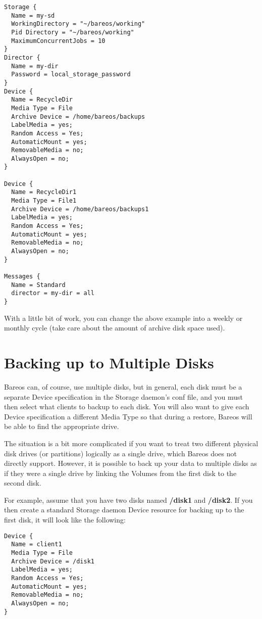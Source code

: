 \footnotesize
\begin{verbatim}
Storage {
  Name = my-sd
  WorkingDirectory = "~/bareos/working"
  Pid Directory = "~/bareos/working"
  MaximumConcurrentJobs = 10
}
Director {
  Name = my-dir
  Password = local_storage_password
}
Device {
  Name = RecycleDir
  Media Type = File
  Archive Device = /home/bareos/backups
  LabelMedia = yes;
  Random Access = Yes;
  AutomaticMount = yes;
  RemovableMedia = no;
  AlwaysOpen = no;
}

Device {
  Name = RecycleDir1
  Media Type = File1
  Archive Device = /home/bareos/backups1
  LabelMedia = yes;
  Random Access = Yes;
  AutomaticMount = yes;
  RemovableMedia = no;
  AlwaysOpen = no;
}

Messages {
  Name = Standard
  director = my-dir = all
}
\end{verbatim}
\normalsize

With a little bit of work, you can change the above example into a weekly or
monthly cycle (take care about the amount of archive disk space used).

\label{MultipleDisks}
\section{Backing up to Multiple Disks}

Bareos can, of course, use multiple disks, but in general, each disk must be a
separate Device specification in the Storage daemon's conf file, and you must
then select what clients to backup to each disk. You will also want to
give each Device specification a different Media Type so that during
a restore, Bareos will be able to find the appropriate drive.

The situation is a bit more complicated if you want to treat two different
physical disk drives (or partitions) logically as a single drive, which
Bareos does not directly support.  However, it is possible to back up your
data to multiple disks as if they were a single drive by linking the
Volumes from the first disk to the second disk.

For example, assume that you have two disks named {\bf /disk1} and {\bf
/disk2}. If you then create a standard Storage daemon Device resource for
backing up to the first disk, it will look like the following:

\footnotesize
\begin{verbatim}
Device {
  Name = client1
  Media Type = File
  Archive Device = /disk1
  LabelMedia = yes;
  Random Access = Yes;
  AutomaticMount = yes;
  RemovableMedia = no;
  AlwaysOpen = no;
}
\end{verbatim}
\normalsize

